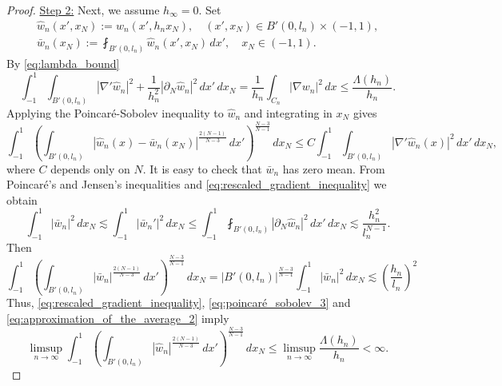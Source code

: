 \documentclass{article}
\numberwithin{equation}{section}
\theoremstyle{definition}
\theoremstyle{remark}
\begin{document}
\begin{proof}
    \underline{Step 2:} Next, we assume $h_\infty = 0$. Set
    \begin{gather*}
        \hat{w}_n(x', x_N) := w_n(x', h_n x_N), \quad (x', x_N) \in B'(0, l_n) \times (-1, 1), \\
        \bar{w}_n(x_N) := \fint_{B'(0, l_n)} \hat{w}_n(x', x_N) \, dx', \quad x_N \in (-1, 1).
    \end{gather*}
    By \eqref{eq:lambda_bound}
    \begin{equation} \label{eq:rescaled_gradient_inequality}
        \int_{-1}^1 \int_{B'(0, l_n)} |\nabla' \hat{w}_n|^2 + \frac{1}{h_n^2} |\partial_N \hat{w}_n|^2 \, dx' \, dx_N = \frac{1}{h_n} \int_{C_n} |\nabla w_n|^2 \, dx \le \frac{\Lambda(h_n)}{h_n}.
    \end{equation}
    Applying the Poincaré-Sobolev inequality to $\hat{w}_n$ and integrating in $x_N$ gives
    \begin{equation} \label{eq:poincaré_sobolev_3}
        \int_{-1}^1 \left(\int_{B'(0, l_n)} |\hat{w}_n(x) - \bar{w}_n(x_N)|^\frac{2(N - 1)}{N - 3} \, dx'\right)^\frac{N - 3}{N - 1} \, dx_N \le C \int_{-1}^1 \int_{B'(0, l_n)} |\nabla' \hat{w}_n(x)|^2 \, dx' \, dx_N,
    \end{equation}
    where $C$ depends only on $N$. It is easy to check that $\bar{w}_n$ has zero mean. From Poincaré's and Jensen's inequalities and \eqref{eq:rescaled_gradient_inequality} we obtain
    \[
    \int_{-1}^1 |\bar{w}_n|^2 \, dx_N \lesssim \int_{-1}^1 |\bar{w}_n'|^2 \, dx_N \le \int_{-1}^1 \fint_{B'(0, l_n)} |\partial_N \hat{w}_n|^2 \, dx' \, dx_N \lesssim \frac{h_n^2}{l_n^{N - 1}}.
    \]
    Then
    \begin{equation} \label{eq:approximation_of_the_average_2}
        \int_{-1}^1 \left(\int_{B'(0, l_n)} |\bar{w}_n|^\frac{2(N - 1)}{N - 3} \, dx'\right)^\frac{N - 3}{N - 1} \, dx_N = |B'(0, l_n)|^\frac{N - 3}{N - 1} \int_{-1}^1 |\bar{w}_n|^2 \, dx_N \lesssim \left(\frac{h_n}{l_n}\right)^2
    \end{equation}
    Thus, \eqref{eq:rescaled_gradient_inequality}, \eqref{eq:poincaré_sobolev_3} and \eqref{eq:approximation_of_the_average_2} imply
    \[
    \limsup_{n \to \infty}\int_{-1}^1 \left(\int_{B'(0, l_n)} |\hat{w}_n|^\frac{2(N - 1)}{N - 3} \, dx'\right)^\frac{N - 3}{N - 1} \, dx_N \le \limsup_{n \to \infty} \frac{\Lambda(h_n)}{h_n} < \infty.
    \]

\end{proof}
\end{document}

